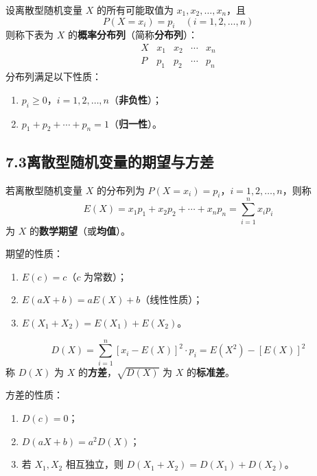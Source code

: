 \documentclass[12pt, a4paper]{ctexart}
\begin{document}
\begin{knowledgebox}[分布列的定义与性质]
设离散型随机变量 $X$ 的所有可能取值为 $x_1, x_2, \ldots, x_n$，且
\[
P(X = x_i) = p_i \quad (i = 1, 2, \ldots, n)
\]
则称下表为 $X$ 的\textbf{概率分布列}（简称\textbf{分布列}）：
\[
\begin{array}{c|cccc}
X & x_1 & x_2 & \cdots & x_n \\
\hline
P & p_1 & p_2 & \cdots & p_n
\end{array}
\]
分布列满足以下性质：
\begin{enumerate}[label=(\arabic*)]
  \item $p_i \geqslant 0$，$i = 1, 2, \ldots, n$（\textbf{非负性}）；
  \item $p_1 + p_2 + \cdots + p_n = 1$（\textbf{归一性}）。
\end{enumerate}
\end{knowledgebox}

\subsection*{7.3\quad 离散型随机变量的期望与方差}

\begin{knowledgebox}[数学期望]
若离散型随机变量 $X$ 的分布列为 $P(X = x_i) = p_i$，$i = 1, 2, \ldots, n$，则称
\[
E(X) = x_1 p_1 + x_2 p_2 + \cdots + x_n p_n = \sum_{i=1}^{n} x_i p_i
\]
为 $X$ 的\textbf{数学期望}（或\textbf{均值}）。

期望的性质：
\begin{enumerate}[label=(\arabic*)]
  \item $E(c) = c$（$c$ 为常数）；
  \item $E(aX + b) = aE(X) + b$（线性性质）；
  \item $E(X_1 + X_2) = E(X_1) + E(X_2)$。
\end{enumerate}
\end{knowledgebox}

\begin{knowledgebox}[方差与标准差]
\[
D(X) = \sum_{i=1}^{n} [x_i - E(X)]^2 \cdot p_i = E(X^2) - [E(X)]^2
\]
称 $D(X)$ 为 $X$ 的\textbf{方差}，$\sqrt{D(X)}$ 为 $X$ 的\textbf{标准差}。

方差的性质：
\begin{enumerate}[label=(\arabic*)]
  \item $D(c) = 0$；
  \item $D(aX + b) = a^2 D(X)$；
  \item 若 $X_1, X_2$ 相互独立，则 $D(X_1 + X_2) = D(X_1) + D(X_2)$。
\end{enumerate}
\end{knowledgebox}
\end{document}
